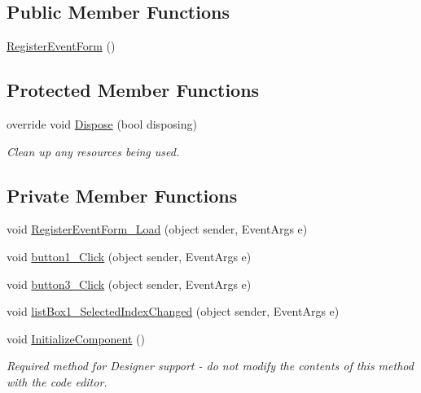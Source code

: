 \subsection*{Public Member Functions}
\begin{DoxyCompactItemize}
\item 
\hyperlink{classProject__Codename__Olympia__v1_1_1__0_1_1RegisterEventForm_a2036d04127c2221ed2a47ec3e27aa1e9}{Register\+Event\+Form} ()
\end{DoxyCompactItemize}
\subsection*{Protected Member Functions}
\begin{DoxyCompactItemize}
\item 
override void \hyperlink{classProject__Codename__Olympia__v1_1_1__0_1_1RegisterEventForm_a36314720f560074be6a7a2fa7bde5cbe}{Dispose} (bool disposing)
\begin{DoxyCompactList}\small\item\em Clean up any resources being used. \end{DoxyCompactList}\end{DoxyCompactItemize}
\subsection*{Private Member Functions}
\begin{DoxyCompactItemize}
\item 
void \hyperlink{classProject__Codename__Olympia__v1_1_1__0_1_1RegisterEventForm_ab5c22fcf44ee9cd90c3ae64d14b48f40}{Register\+Event\+Form\+\_\+\+Load} (object sender, Event\+Args e)
\item 
void \hyperlink{classProject__Codename__Olympia__v1_1_1__0_1_1RegisterEventForm_ab73040973fdfb39c02b928c15ec2e267}{button1\+\_\+\+Click} (object sender, Event\+Args e)
\item 
void \hyperlink{classProject__Codename__Olympia__v1_1_1__0_1_1RegisterEventForm_a339a975ac942ddf86dc9654c738185bb}{button3\+\_\+\+Click} (object sender, Event\+Args e)
\item 
void \hyperlink{classProject__Codename__Olympia__v1_1_1__0_1_1RegisterEventForm_aedcf7d7ff234f676305494bb903b5cd5}{list\+Box1\+\_\+\+Selected\+Index\+Changed} (object sender, Event\+Args e)
\item 
void \hyperlink{classProject__Codename__Olympia__v1_1_1__0_1_1RegisterEventForm_a729299b8fd07b2c179ed0ad3ea56c10e}{Initialize\+Component} ()
\begin{DoxyCompactList}\small\item\em Required method for Designer support -\/ do not modify the contents of this method with the code editor. \end{DoxyCompactList}\end{DoxyCompactItemize}
